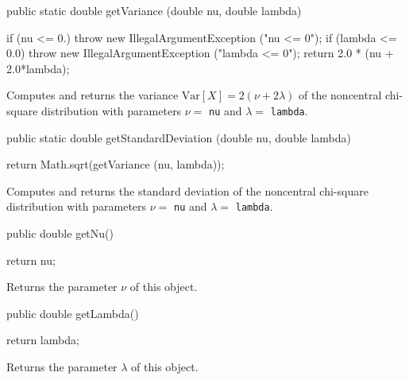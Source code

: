 \begin{code}

   public static double getVariance (double nu, double lambda)\begin{hide} {
      if (nu <= 0.)
         throw new IllegalArgumentException ("nu <= 0");
      if (lambda <= 0.0)
         throw new IllegalArgumentException ("lambda <= 0");
      return  2.0 * (nu + 2.0*lambda);
   }\end{hide}
\end{code}
\begin{tabb}  Computes and returns the variance $\mbox{Var}[X] = 2(\nu +
   2\lambda)$ of the noncentral chi-square distribution with parameters
   $\nu =$ \texttt{nu} and  $\lambda = $ \texttt{lambda}.
\end{tabb}
\begin{htmlonly}
\end{htmlonly}
\begin{code}

   public static double getStandardDeviation (double nu, double lambda)\begin{hide} {
      return Math.sqrt(getVariance (nu, lambda));
   }\end{hide}
\end{code}
\begin{tabb} Computes and returns the standard deviation of the noncentral
  chi-square distribution with parameters $\nu =$ \texttt{nu} and $\lambda = $
  \texttt{lambda}.
\end{tabb}
\begin{htmlonly}
\end{htmlonly}
\begin{code}

   public double getNu()\begin{hide} {
      return nu;
   }\end{hide}
\end{code}
 \begin{tabb} Returns the parameter $\nu$ of this object.
 \end{tabb}
\begin{code}

   public double getLambda()\begin{hide} {
      return lambda;
   }\end{hide}
\end{code}
 \begin{tabb} Returns the parameter $\lambda$ of this object.
 \end{tabb}
